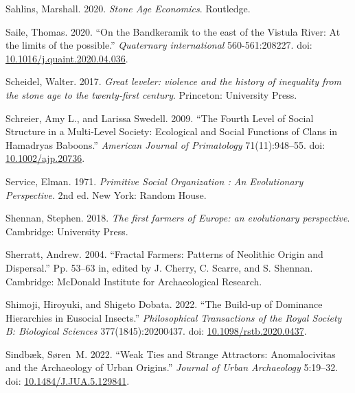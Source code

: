 \documentclass[
  12pt,
]{book}
\newlength{\cslhangindent}
\newlength{\cslentryspacingunit} %
\newenvironment{CSLReferences}[2] %
 {%
  \setlength{\parindent}{0pt}
  \ifodd #1
  \let\oldpar\par
  \def\par{\hangindent=\cslhangindent\oldpar}
  \fi
  \setlength{\parskip}{#2\cslentryspacingunit}
 }%
 {}
\begin{document}
\begin{CSLReferences}{1}{0}
\leavevmode{}%
Sahlins, Marshall. 2020. \emph{Stone Age Economics}. Routledge.

\leavevmode{}%
Saile, Thomas. 2020. {``On the Bandkeramik to the east of the Vistula River: At the limits of the possible.''} \emph{Quaternary international} 560-561:208227. doi: \href{https://doi.org/10.1016/j.quaint.2020.04.036}{10.1016/j.quaint.2020.04.036}.

\leavevmode{}%
Scheidel, Walter. 2017. \emph{Great leveler: violence and the history of inequality from the stone age to the twenty-first century}. Princeton: University Press.

\leavevmode{}%
Schreier, Amy L., and Larissa Swedell. 2009. {``The Fourth Level of Social Structure in a Multi-Level Society: Ecological and Social Functions of Clans in Hamadryas Baboons.''} \emph{American Journal of Primatology} 71(11):948--55. doi: \href{https://doi.org/10.1002/ajp.20736}{10.1002/ajp.20736}.

\leavevmode{}%
Service, Elman. 1971. \emph{Primitive Social Organization : An Evolutionary Perspective}. 2nd ed. New York: Random House.

\leavevmode{}%
Shennan, Stephen. 2018. \emph{The first farmers of Europe: an evolutionary perspective}. Cambridge: University Press.

\leavevmode{}%
Sherratt, Andrew. 2004. {``Fractal Farmers: Patterns of Neolithic Origin and Dispersal.''} Pp. 53--63 in, edited by J. Cherry, C. Scarre, and S. Shennan. Cambridge: McDonald Institute for Archaeological Research.

\leavevmode{}%
Shimoji, Hiroyuki, and Shigeto Dobata. 2022. {``The Build-up of Dominance Hierarchies in Eusocial Insects.''} \emph{Philosophical Transactions of the Royal Society B: Biological Sciences} 377(1845):20200437. doi: \href{https://doi.org/10.1098/rstb.2020.0437}{10.1098/rstb.2020.0437}.

\leavevmode{}%
Sindbæk, Søren~M. 2022. {``Weak Ties and Strange Attractors: Anomalocivitas and the Archaeology of Urban Origins.''} \emph{Journal of Urban Archaeology} 5:19--32. doi: \href{https://doi.org/10.1484/J.JUA.5.129841}{10.1484/J.JUA.5.129841}.


\end{CSLReferences}
\end{document}
